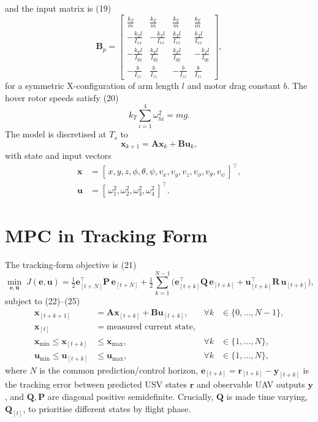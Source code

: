 \documentclass[12pt,a4paper]{report}
\begin{document}
and the input matrix is (19)
\begin{equation}\label{eq:Bp}
\bm{B}_p =
\begin{bmatrix}
\frac{k_T}{m} & \frac{k_T}{m} & \frac{k_T}{m} & \frac{k_T}{m}\\[3pt]
-\frac{k_Tl}{I_{xx}} & -\frac{k_Tl}{I_{xx}} & \frac{k_Tl}{I_{xx}} & \frac{k_Tl}{I_{xx}}\\[3pt]
-\frac{k_Tl}{I_{yy}} & \frac{k_Tl}{I_{yy}} & \frac{k_Tl}{I_{yy}} & -\frac{k_Tl}{I_{yy}}\\[3pt]
-\frac{b}{I_{zz}} & \frac{b}{I_{zz}} & -\frac{b}{I_{zz}} & \frac{b}{I_{zz}}
\end{bmatrix},
\end{equation}
for a symmetric X-configuration of arm length $l$ and motor drag constant $b$. The hover rotor speeds satisfy (20)
\begin{equation}\label{eq:hover}
k_T\sum_{i=1}^{4}\omega_{hi}^2 = mg.
\end{equation}
The model is discretised at $T_s$ to
\begin{equation}
  \bm{x}_{k+1}=\bm{A}\bm{x}_k+\bm{B}\bm{u}_k,
\end{equation}
with state and input vectors
\begin{align}
  \bm{x} &= [\,x,y,z,\phi,\theta,\psi,
              v_x,v_y,v_z,v_\phi,v_\theta,v_\psi\,]^\top, \\
  \bm{u} &= [\,\omega_1^2,\omega_2^2,\omega_3^2,\omega_4^2\,]^\top.
\end{align}

\section{MPC in Tracking Form}
The tracking-form objective is (21)
\begin{equation}\label{eq:cost}
\min_{\bm{e},\bm{u}}\; J(\bm{e},\bm{u}) = \tfrac{1}{2}\bm{e}_{[t+N]}^\top \bm{P}\,\bm{e}_{[t+N]} + \tfrac{1}{2}\sum_{k=1}^{N-1}\Big(\bm{e}_{[t+k]}^\top \bm{Q}\,\bm{e}_{[t+k]} + \bm{u}_{[t+k]}^\top \bm{R}\,\bm{u}_{[t+k]}\Big),
\end{equation}
subject to (22)--(25)
\begin{align}
\bm{x}_{[t+k+1]} &= \bm{A}\bm{x}_{[t+k]} + \bm{B}\bm{u}_{[t+k]}, & \forall k&\in\{0,\dots,N-1\},\\
\bm{x}_{[t]} &= \text{measured current state},\\
\bm{x}_{\min} \le \bm{x}_{[t+k]} &\le \bm{x}_{\max}, & \forall k&\in\{1,\dots,N\},\\
\bm{u}_{\min} \le \bm{u}_{[t+k]} &\le \bm{u}_{\max}, & \forall k&\in\{1,\dots,N\},
\end{align}
where $N$ is the common prediction/control horizon, $\bm{e}_{[t+k]}=\bm{r}_{[t+k]}-\bm{y}_{[t+k]}$ is the tracking error between predicted USV states $\bm{r}$ and observable UAV outputs $\bm{y}$, and $\bm{Q},\bm{P}$ are diagonal positive semidefinite. Crucially, $\bm{Q}$ is made time varying, $\bm{Q}_{[t]}$, to prioritise different states by flight phase.
\end{document}
